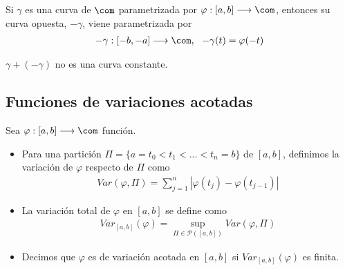 \begin{defi}
Si $\gamma$ es una curva de $\com$ parametrizada por $\varphi : [a,b] \longrightarrow \com$, entonces su curva opuesta, $-\gamma$, viene parametrizada por
\begin{align*}
    -\gamma : [-b,-a] \longrightarrow \com, \ \ -\gamma(t) = \varphi(-t)
\end{align*}
\end{defi}

\begin{obs}
$\gamma + (-\gamma)$ no es una curva constante.
\end{obs}

\subsection{Funciones de variaciones acotadas}

\begin{defi}
Sea $\varphi : [a,b] \longrightarrow \com$ función.
\begin{itemize}
    \item Para una partición $\Pi = \{ a = t_0 < t_1 < ... < t_n = b \}$ de $[a,b]$, definimos la variación de $\varphi$ respecto de $\Pi$ como
    \begin{align*}
        Var(\varphi, \Pi) = \sum_{j=1}^{n}{|\varphi(t_j) - \varphi(t_{j-1})|}
    \end{align*}
    \item La variación total de $\varphi$ en $[a,b]$ se define como
    \begin{align*}
        Var_{[a,b]}(\varphi) = \sup_{\Pi \in \mathcal{P}([a,b])} Var(\varphi, \Pi)
    \end{align*}
    \item Decimos que $\varphi$ es de variación acotada en $[a,b]$ si $Var_{[a,b]}(\varphi)$ es finita.
\end{itemize}
\end{defi}

